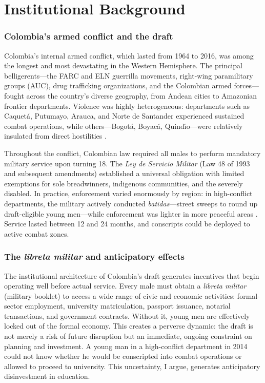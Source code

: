 \documentclass[12pt]{article}
\begin{document}
\section{Institutional Background}

\subsubsection*{Colombia's armed conflict and the draft} Colombia's internal armed conflict, which lasted from 1964 to 2016, was among the longest and most devastating in the Western Hemisphere. The principal belligerents---the FARC and ELN guerrilla movements, right-wing paramilitary groups (AUC), drug trafficking organizations, and the Colombian armed forces---fought across the country's diverse geography, from Andean cities to Amazonian frontier departments. Violence was highly heterogeneous: departments such as Caquet\'{a}, Putumayo, Arauca, and Norte de Santander experienced sustained combat operations, while others---Bogot\'{a}, Boyac\'{a}, Quind\'{\i}o---were relatively insulated from direct hostilities \citep{dube2016,prem2022}.

Throughout the conflict, Colombian law required all males to perform mandatory military service upon turning 18. The \textit{Ley de Servicio Militar} (Law 48 of 1993 and subsequent amendments) established a universal obligation with limited exemptions for sole breadwinners, indigenous communities, and the severely disabled. In practice, enforcement varied enormously by region: in high-conflict departments, the military actively conducted \textit{batidas}---street sweeps to round up draft-eligible young men---while enforcement was lighter in more peaceful areas \citep{rodriguez2010}. Service lasted between 12 and 24 months, and conscripts could be deployed to active combat zones.

\subsubsection*{The \textit{libreta militar} and anticipatory effects} The institutional architecture of Colombia's draft generates incentives that begin operating well before actual service. Every male must obtain a \textit{libreta militar} (military booklet) to access a wide range of civic and economic activities: formal-sector employment, university matriculation, passport issuance, notarial transactions, and government contracts. Without it, young men are effectively locked out of the formal economy. This creates a perverse dynamic: the draft is not merely a risk of future disruption but an immediate, ongoing constraint on planning and investment. A young man in a high-conflict department in 2014 could not know whether he would be conscripted into combat operations or allowed to proceed to university. This uncertainty, I argue, generates anticipatory disinvestment in education.
\end{document}
